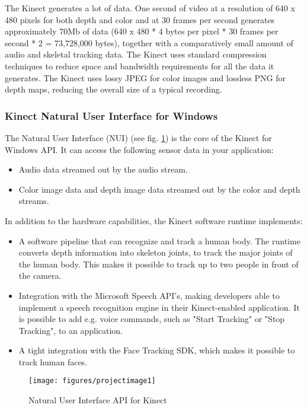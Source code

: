 The Kinect generates a lot of data. 
One second of video at a resolution of 640 x 480 pixels for both depth and color and at 30 frames per second generates approximately 70Mb of data (640 x 480 * 4 bytes per pixel 
* 30 frames per second * 2 = 73,728,000 bytes), together with a comparatively small amount of audio and skeletal tracking data.
The Kinect uses standard compression techniques to reduce space and bandwidth requirements for all the data it generates. The Kinect uses lossy JPEG for color images and lossless PNG for depth maps, reducing the overall size of a typical recording.

\subsubsection{Kinect Natural User Interface for Windows}
The Natural User Interface (NUI) (see fig. \ref{fig:nuiapi}) is the core of the Kinect for Windows API. It can access the following sensor data in your application:

\begin{itemize}
\item Audio data streamed out by the audio stream.
\item Color image data and depth image data streamed out by the color and depth streams.
\end{itemize}

In addition to the hardware capabilities, the Kinect software runtime implements:
\begin{itemize}
\item A software pipeline that can recognize and track a human body. The runtime converts depth information into skeleton joints, to track the major joints of the human body. This makes it possible to track up to two people in front of the camera.
\item Integration with the Microsoft Speech API's, making developers able to implement a speech recognition engine in their Kinect-enabled application. It is possible to add e.g. voice commands, such as "Start Tracking" or "Stop Tracking", to an application.
\item A tight integration with the Face Tracking SDK, which makes it possible to track human faces.
\end{itemize}

\begin{figure}[hbt]
  \center
        \texttt{[image: figures/projectimage1]}
        \caption{Natural User Interface API for Kinect}
  \label{fig:nuiapi}
\end{figure}

